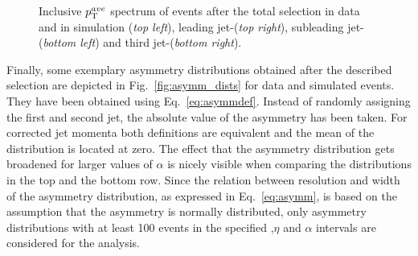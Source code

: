 \begin{figure}[!tp]
\begin{tabular}{cc}
  \end{tabular}
  \caption{Inclusive $p_{\text{T}}^{ave}$ spectrum of events after the total selection in data and in simulation (\textit{top left}), leading jet-\pt (\textit{top right}), subleading jet-\pt (\textit{bottom left}) and third jet-\pt (\textit{bottom right}).}
  \label{fig:ptave_spec}
\end{figure}
Finally, some exemplary asymmetry distributions obtained after the described selection are depicted in Fig.~\ref{fig:asymm_dists} for data and simulated events. They have been obtained using Eq.~\ref{eq:asymmdef}. Instead of randomly assigning the first and second jet, the absolute value of the asymmetry has been taken. For corrected jet momenta both definitions are equivalent and the mean of the distribution is located at zero. The effect that the asymmetry distribution gets broadened for larger values of $\alpha$ is nicely visible when comparing the distributions in the top and the bottom row. Since the relation between resolution and width of the asymmetry distribution, as expressed in Eq.~\ref{eq:asymm}, is based on the assumption that the asymmetry is normally distributed, only asymmetry distributions with at least 100 events in the specified \ptave,$\eta$ and $\alpha$ intervals are considered for the analysis. 
